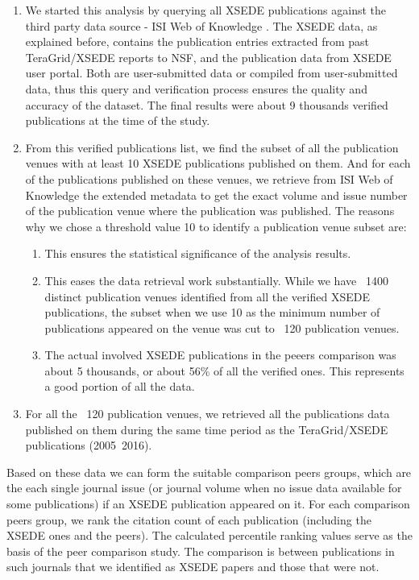 \documentclass{sig-alternate}
\begin{document}
\begin{enumerate}
\item We started this analysis by querying all XSEDE publications against the third party
data source - ISI Web of Knowledge \cite{www-isiwos}. The XSEDE data, as explained before,
contains the publication entries extracted from past TeraGrid/XSEDE reports to NSF, and the
publication data from XSEDE user portal. Both are user-submitted data or compiled from user-submitted
data, thus this query and verification process ensures the quality and accuracy of the dataset.
The final results were about 9 thousands verified publications at the time of the study.

\item From this verified publications list, we find the subset of all the publication venues with at least 10
XSEDE publications published on them. And for each of the publications published on these venues,
we retrieve from ISI Web of Knowledge the extended metadata to get the exact volume and issue
number of the publication venue where the publication was published. The reasons why we chose
a threshold value 10 to identify a publication venue subset are:
\begin{enumerate}
\item This ensures the statistical significance of the analysis results.
\item This eases the data retrieval work substantially. While we have ~1400 distinct publication
venues identified from all the verified XSEDE publications, the subset when we use 10 as the minimum
number of publications appeared on the venue was cut to ~120 publication venues.
\item The actual involved XSEDE publications in the peeers comparison was about 5 thousands, or about
56\% of all the verified ones. This represents a good portion of all the data.
\end{enumerate}

\item For all the ~120 publication venues, we retrieved all the publications data published on them
during the same time period as the TeraGrid/XSEDE publications (2005~2016).
\end{enumerate}

Based on these data we can form the suitable comparison peers groups, which are the each single
journal issue (or journal volume when no issue data available for some publications) if an XSEDE
publication appeared on it. For each comparison peers group, we rank the
citation count of each publication (including the XSEDE ones and the peers). The calculated percentile
ranking values serve as the basis of the peer comparison study. The comparison is between publications
in such journals that we identified as XSEDE papers and those that were not.
\end{document}

